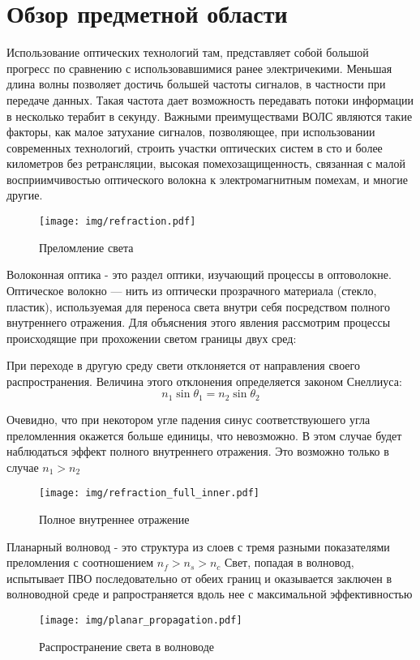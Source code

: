 \chapter{Обзор предметной области}
Использование оптических технологий там, представляет собой большой прогресс по сравнению с использовавшимися ранее электричекими. Меньшая длина волны позволяет достичь большей частоты сигналов, в частности при передаче данных. Такая частота дает возможность передавать потоки информации в несколько терабит в секунду. Важными преимуществами ВОЛС являются такие факторы, как малое затухание сигналов, позволяющее, при использовании современных технологий, строить участки оптических систем в сто и более километров без ретрансляции, высокая помехозащищенность, связанная с малой восприимчивостью оптического волокна к электромагнитным помехам, и многие другие.

\begin{figure}[h!]
\texttt{[image: img/refraction.pdf]}
\caption{Преломление света}
\end{figure}

Волоконная оптика - это раздел оптики, изучающий процессы в оптоволокне. Оптическое волокно — нить из оптически прозрачного материала (стекло, пластик), используемая для переноса света внутри себя посредством полного внутреннего отражения. Для объяснения этого явления рассмотрим процессы происходящие при прохожении светом границы двух сред:

При переходе в другую среду свети отклоняется от направления своего распространения. Величина этого отклонения определяется законом Снеллиуса:
\begin{equation}
 n_1 \sin\theta_1 = n_2 \sin\theta_2
\end{equation}

Очевидно, что при некотором угле падения синус соответствуюшего угла преломленния окажется больше единицы, что невозможно. В этом случае будет наблюдаться эффект полного внутреннего отражения. Это возможно только в случае $n_1 > n_2$

\begin{figure}[h!]
\texttt{[image: img/refraction\_full\_inner.pdf]}
\caption{Полное внутреннее отражение}
\end{figure}

Планарный волновод - это структура из слоев с тремя разными показателями преломления с соотношением $n_f > n_s > n_c$ Свет, попадая в волновод, испытывает ПВО последовательно от обеих границ и оказывается заключен в волноводной среде и рапространяется вдоль нее с максимальной эффективностью

\begin{figure}[h!]
\texttt{[image: img/planar\_propagation.pdf]}
\caption{Распространение света в волноводе}
\end{figure}
